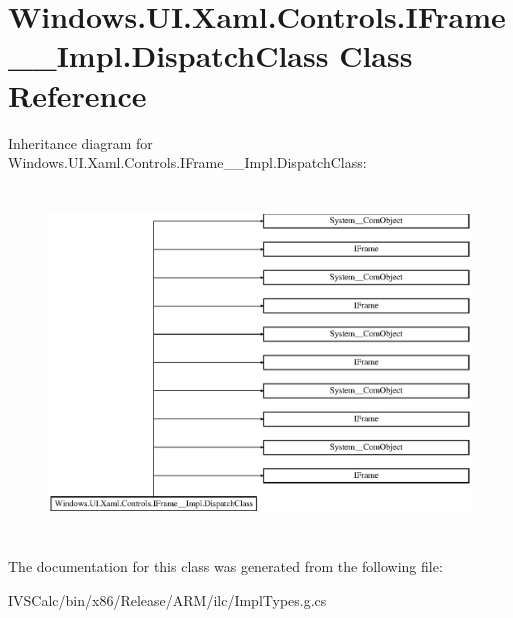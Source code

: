 \hypertarget{class_windows_1_1_u_i_1_1_xaml_1_1_controls_1_1_i_frame_____impl_1_1_dispatch_class}{}\section{Windows.\+U\+I.\+Xaml.\+Controls.\+I\+Frame\+\_\+\+\_\+\+Impl.\+Dispatch\+Class Class Reference}
\label{class_windows_1_1_u_i_1_1_xaml_1_1_controls_1_1_i_frame_____impl_1_1_dispatch_class}
Inheritance diagram for Windows.\+U\+I.\+Xaml.\+Controls.\+I\+Frame\+\_\+\+\_\+\+Impl.\+Dispatch\+Class\+:\begin{figure}[H]
\begin{center}
\leavevmode
\includegraphics[height=9.305137cm]{class_windows_1_1_u_i_1_1_xaml_1_1_controls_1_1_i_frame_____impl_1_1_dispatch_class}
\end{center}
\end{figure}


The documentation for this class was generated from the following file\+:\begin{DoxyCompactItemize}
\item 
I\+V\+S\+Calc/bin/x86/\+Release/\+A\+R\+M/ilc/Impl\+Types.\+g.\+cs\end{DoxyCompactItemize}
